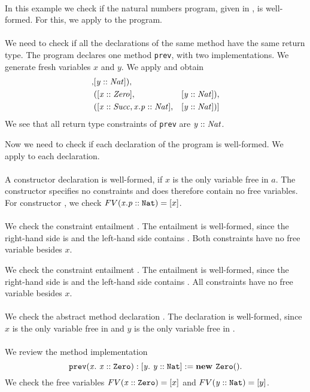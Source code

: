 \begin{example}\quad\\
\label{ex:wf-naturalnumbers}
In this example we check if the natural numbers program,
given in , is well-formed.
For this, we apply  to the program.\\
\\
We need to check if all the declarations
of the same method have the same return type.
The program declares one method \texttt{prev},
with two implementations.
We generate fresh variables $x$ and $y$.
We apply 
and obtain
\begin{align*}
[
  &([\instOf{x}{Nat}], &[\instOf{y}{Nat}]),\\
  &([\instOf{x}{Zero}], &[\instOf{y}{Nat}]),\\
  &([\instOf{x}{Succ}, \instOf{x.p}{Nat}], &[\instOf{y}{Nat}])
]
\end{align*}
We see that all return type constraints of \texttt{prev} are $\mathit{y} :: \mathit{Nat}$.

Now we need to check if each declaration of the program is well-formed.
We apply  to each declaration.\\
\\
A constructor declaration  is well-formed,
if $x$ is the only variable free in $a$.
The constructor 
specifies no constraints and does therefore contain no free variables.
For constructor ,
we check $FV(\mathit{x.p} :: \mathit{\texttt{Nat}}) = [x]$.\\
\\
We check the constraint entailment .
The entailment is well-formed, since the right-hand side is 
and the left-hand side contains .
Both constraints have no free variable besides $x$.

We check the constraint entailment .
The entailment is well-formed, since the right-hand side is 
and the left-hand side contains .
All constraints have no free variable besides $x$.\\
\\
We check the abstract method declaration
.
The declaration is well-formed,
since $x$ is the only variable free in 
and $y$ is the only variable free in .\\
\\
We review the method implementation
\[
  \mathit{\texttt{prev}}(\mathit{x}.\ \mathit{\mathit{x} :: \mathit{\texttt{Zero}}}): \mathit{[y.\ \mathit{\mathit{y} :: \mathit{\texttt{Nat}}}]} := \mathit{\textbf{new } \mathit{\texttt{Zero}}()}.
\]
We check the free variables
$FV(\mathit{x} :: \mathit{\texttt{Zero}}) = [x]$
and
$FV(\mathit{y} :: \mathit{\texttt{Nat}}) = [y]$.


\end{example}
